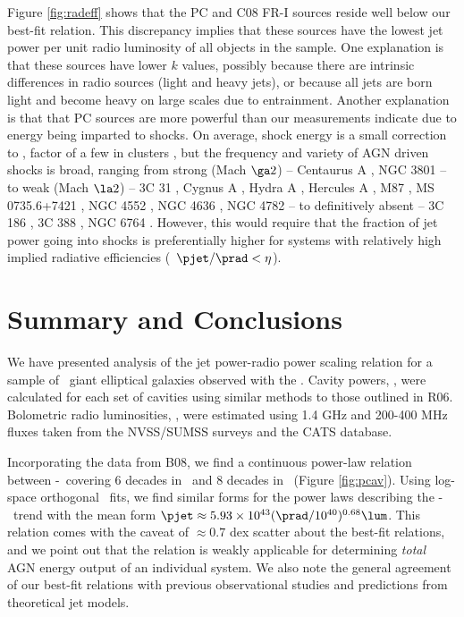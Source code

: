 \documentclass{emulateapj}
\begin{document}
Figure \ref{fig:radeff} shows that the PC and C08 FR-I sources reside
well below our best-fit relation. This discrepancy implies that these
sources have the lowest jet power per unit radio luminosity of all
objects in the sample. One explanation is that these sources have
lower $k$ values, possibly because there are intrinsic differences in
radio sources (light and heavy jets), or because all jets are born
light and become heavy on large scales due to entrainment. Another
explanation is that that PC sources are more powerful than our
measurements indicate due to energy being imparted to shocks. On
average, shock energy is a small correction to \pcav, factor of a few
in clusters \citep{mcnamrev}, but the frequency and variety of AGN
driven shocks is broad, ranging from strong (Mach $\ga 2$) --
Centaurus A \citep{2003ApJ...592..129K, 2009MNRAS.395.1999C}, NGC 3801
\citep{2007ApJ...660..191C} -- to weak (Mach $\la 2$) -- 3C 31
\citep{2002MNRAS.336.1161L}, Cygnus A \citep{2006ApJ...644L...9W},
Hydra A \citep{hydraa}, Hercules A \citep{herca}, M87
\citep{2007ApJ...665.1057F}, MS 0735.6+7421 \citep{ms0735}, NGC 4552
\citep{2006ApJ...648..947M}, NGC 4636 \citep{2009arXiv0909.2942B}, NGC
4782 \citep{2007ApJ...664..804M} -- to definitively absent -- 3C 186
\citep{2008ApJ...684..811S}, 3C 388 \citep{2006ApJ...639..753K}, NGC
6764 \citep{2008ApJ...688..190C}. However, this would require that the
fraction of jet power going into shocks is preferentially higher for
systems with relatively high implied radiative efficiencies
(\ie\ $\pjet/\prad < \eta$).

\section{Summary and Conclusions}
\label{sec:summary}

We have presented analysis of the jet power-radio power scaling
relation for a sample of \samp\ giant elliptical galaxies observed
with the \cxo. Cavity powers, \pjet, were calculated for each set of
cavities using similar methods to those outlined in R06. Bolometric
radio luminosities, \prad, were estimated using 1.4 GHz and 200-400
MHz fluxes taken from the NVSS/SUMSS surveys and the CATS database.

Incorporating the data from B08, we find a continuous power-law
relation between \pjet-\prad\ covering 6 decades in \prad\ and 8
decades in \pjet\ (Figure \ref{fig:pcav}). Using log-space orthogonal
\bces\ fits, we find similar forms for the power laws describing the
\pjet-\prad\ trend with the mean form $\pjet \approx 5.93\times10^{43}
(\prad/10^{40})^{0.68} \lum$. This relation comes with the caveat of
$\approx 0.7$ dex scatter about the best-fit relations, and we point
out that the relation is weakly applicable for determining
{\it{total}} AGN energy output of an individual system. We also note
the general agreement of our best-fit relations with previous
observational studies and predictions from theoretical jet models.
\end{document}
